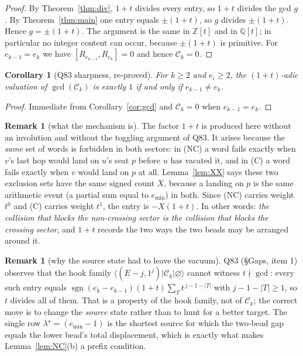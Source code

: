 \documentclass[11pt]{article}
\newtheorem{corollary}[theorem]{Corollary}
\theoremstyle{definition}
\newtheorem{remark}[theorem]{Remark}
\newcommand{\Ck}{\mathcal{C}}
\newcommand{\Z}{\mathbb{Z}}
\newcommand{\Q}{\mathbb{Q}}
\newcommand{\vac}{\varnothing}
\DeclareMathOperator{\sgn}{sgn}
\begin{document}
\begin{proof}
By Theorem~\ref{thm:div}, $1+t$ divides every entry, so $1+t$ divides the gcd $g$.  By
Theorem~\ref{thm:main} one entry equals $\pm(1+t)$, so $g$ divides $\pm(1+t)$.  Hence
$g=\pm(1+t)$.  The argument is the same in $\Z[t]$ and in $\Q[t]$; in particular no
integer content can occur, because $\pm(1+t)$ is primitive.  For $e_{k-1}=e_k$ we have
$[R_{e_{k-1}},R_{e_k}]=0$ and hence $\Ck_k=0$.
\end{proof}

\begin{corollary}[Q83 sharpness, re-proved]\label{cor:sharp}
For $k\ge2$ and $e_i\ge2$, the $(1+t)$-adic valuation of $\gcd(\Ck_k)$ is exactly $1$ if
and only if $e_{k-1}\ne e_k$.
\end{corollary}

\begin{proof}
Immediate from Corollary~\ref{cor:gcd} and $\Ck_k=0$ when $e_{k-1}=e_k$.
\end{proof}

\begin{remark}[what the mechanism is]
The factor $1+t$ is produced here without an involution and without the toggling
argument of Q83.  It arises because the \emph{same} set of words is forbidden in both
sectors: in (NC) a word fails exactly when $v$'s last hop would land on $u$'s seat $p$
before $u$ has vacated it, and in (C) a word fails exactly when $v$ would land on $p$ at
all.  Lemma~\ref{lem:XX} says these two exclusion sets have the same signed count $X$,
because a landing on $p$ is the same arithmetic event (a partial sum equal to
$e_{\min}$) in both.  Since (NC) carries weight $t^0$ and (C) carries weight $t^1$, the
entry is $-X(1+t)$.  In other words: \emph{the collision that blocks the non-crossing
sector is the collision that blocks the crossing sector}, and $1+t$ records the two ways
the two beads may be arranged around it.
\end{remark}

\begin{remark}[why the source state had to leave the vacuum]
Q83 (\S Gaps, item 1) observes that the hook family
$\langle(E-j,1^j)|\Ck_k|\vac\rangle$ cannot witness $t\nmid\gcd$: every such entry equals
$\sgn(e_k-e_{k-1})(1+t)\sum_T t^{\,j-1-|T|}$ with $j-1-|T|\ge1$, so $t$ divides all of
them.  That is a property of the hook family, not of $\Ck_k$; the correct move is to
change the \emph{source} state rather than to hunt for a better target.  The single row
$\lambda^\star=(e_{\min}-1)$ is the shortest source for which the two-bead gap equals the
lower bead's total displacement, which is exactly what makes Lemma~\ref{lem:NC}(b) a
prefix condition.
\end{remark}
\end{document}
